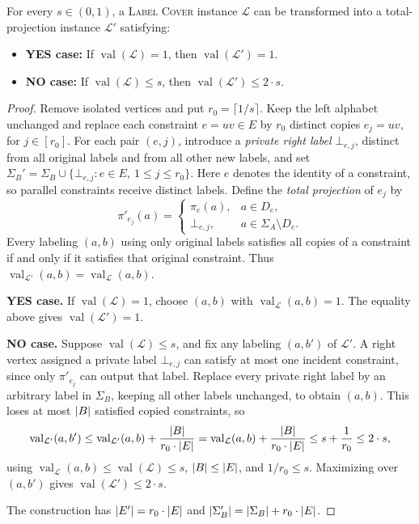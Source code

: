 \begin{lemma}\label{lem:label-cover-totalization}
    For every $s\in(0,1)$, a \textup{\textsc{Label Cover}} instance $\mathcal L$ can be transformed into a total-projection instance $\mathcal L'$ satisfying:
    \begin{itemize}
        \item \textbf{YES case:} If $\operatorname{val}(\mathcal L)=1$, then $\operatorname{val}(\mathcal L')=1$.
        \item \textbf{NO case:} If $\operatorname{val}(\mathcal L)\leq s$, then $\operatorname{val}(\mathcal L')\leq2\cdot s$.
    \end{itemize}
\end{lemma}
\begin{proof}
    Remove isolated vertices and put $r_0=\lceil1/s\rceil$. Keep the left alphabet unchanged and replace each constraint $e=uv\in E$ by $r_0$ distinct copies $e_j=uv$, for $j\in[r_0]$. For each pair $(e,j)$, introduce a \emph{private right label} $\bot_{e,j}$, distinct from all original labels and from all other new labels, and set $\Sigma_B'=\Sigma_B\cup\{\bot_{e,j}\colon e\in E,\ 1\leq j\leq r_0\}$. Here $e$ denotes the identity of a constraint, so parallel constraints receive distinct labels. Define the \emph{total projection} of $e_j$ by
    \[
        \pi'_{e_j}(a)=
        \begin{cases}
            \pi_e(a), & a\in D_e,\\
            \bot_{e,j}, & a\in\Sigma_A\setminus D_e.
        \end{cases}
    \]
    Every labeling $(a,b)$ using only original labels satisfies all copies of a constraint if and only if it satisfies that original constraint. Thus $\operatorname{val}_{\mathcal L'}(a,b)=\operatorname{val}_{\mathcal L}(a,b)$. \par\noindent\textbf{YES case.}
    If $\operatorname{val}(\mathcal L)=1$, choose $(a,b)$ with $\operatorname{val}_{\mathcal L}(a,b)=1$. The equality above gives $\operatorname{val}(\mathcal L')=1$.

    \par\noindent\textbf{NO case.}
    Suppose $\operatorname{val}(\mathcal L)\leq s$, and fix any labeling $(a,b')$ of $\mathcal L'$. A right vertex assigned a private label $\bot_{e,j}$ can satisfy at most one incident constraint, since only $\pi'_{e_j}$ can output that label. Replace every private right label by an arbitrary label in $\Sigma_B$, keeping all other labels unchanged, to obtain $(a,b)$. This loses at most $\mathopen{}\left| B \right|$ satisfied copied constraints, so
    \[
        \operatorname{val}_{\mathcal L'}(a,b')
        \leq\operatorname{val}_{\mathcal L'}(a,b)+\frac{\mathopen{}\left| B \right|}{r_0\cdot\mathopen{}\left| E \right|}
        =\operatorname{val}_{\mathcal L}(a,b)+\frac{\mathopen{}\left| B \right|}{r_0\cdot\mathopen{}\left| E \right|}
        \leq s+\frac1{r_0}\leq2\cdot s,
    \]
    using $\operatorname{val}_{\mathcal L}(a,b)\leq\operatorname{val}(\mathcal L)\leq s$, $\mathopen{}\left| B \right|\leq\mathopen{}\left| E \right|$, and $1/r_0\leq s$. Maximizing over $(a,b')$ gives $\operatorname{val}(\mathcal L')\leq2\cdot s$.

    The construction has $\mathopen{}\left| E' \right|=r_0\cdot\mathopen{}\left| E \right|$ and $\mathopen{}\left| \Sigma_B' \right|=\mathopen{}\left| \Sigma_B \right|+r_0\cdot\mathopen{}\left| E \right|$.
\end{proof}

